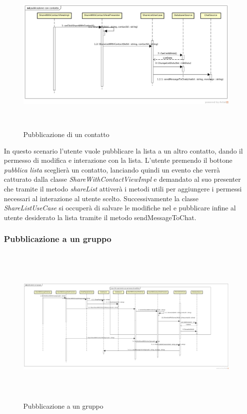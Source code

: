\label{Pubblicazione di un contatto}
\begin{figure}[H]
	\centering
	\includegraphics[width=12cm, height=8cm]{Sezioni/Diagrammi/img_app/publicazione_con_contatto.jpg}
	\caption{Pubblicazione di un contatto}
	
\end{figure}
In questo scenario l'utente vuole pubblicare la lista a un altro contatto, dando il permesso di modifica e interazione con la lista. L'utente premendo il bottone \textit{pubblica lista} sceglierà un contatto, lanciando quindi un evento che verrà catturato dalla classe \textit{ShareWithContactViewImpl} e demandato al suo presenter che tramite il metodo \textit{shareList} attiverà i metodi utili per aggiungere i permessi necessari al interazione al utente scelto. Successivamente la classe \textit{ShareListUseCase} si occuperà di salvare le modifiche nel  e pubblicare infine al utente desiderato la lista tramite il metodo {sendMessageToChat}.


\subsubsection{Pubblicazione a un gruppo}

\label{Pubblicazione a un gruppo}
\begin{figure}[H]
	\centering
	\includegraphics[width=12cm, height=8cm]{Sezioni/Diagrammi/img_app/publicazione_con_gruppo.jpg}
	\caption{Pubblicazione a un gruppo}
	
\end{figure}

